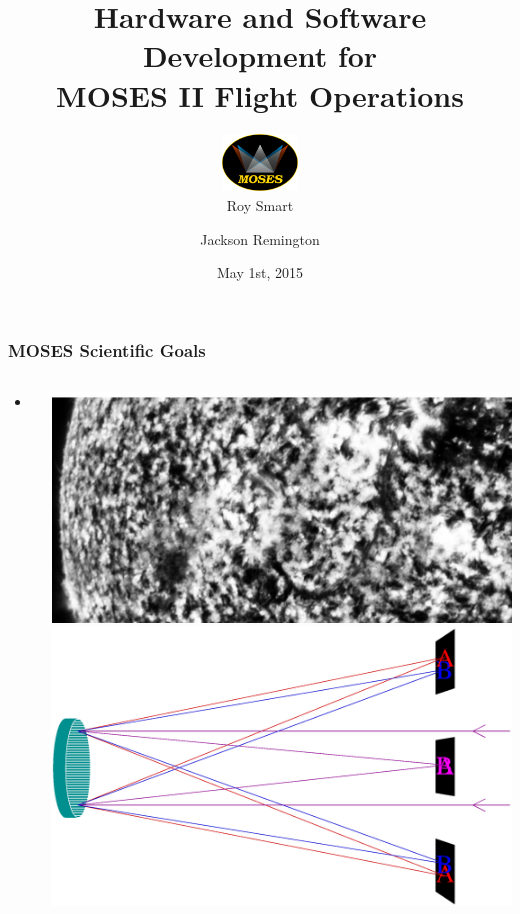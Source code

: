 \documentclass[landscape,xcolor={table}]{beamer}
\title[...]{Hardware and Software Development for \\ MOSES II Flight Operations}
\author[Smart, Remington]{
\includegraphics[width=2cm]{images/moses_logo_with_text} 
\\ Roy Smart \and Jackson Remington}
\institute{Montana State University}
\date{May 1st, 2015 \\ }
\begin{document}
	\begin{frame}[plain]
	        \titlepage
	\end{frame}
	
	\begin{frame}
		
		\frametitle{MOSES Scientific Goals}
		
		\begin{columns}[T] %
		\begin{column}{.48\textwidth}

			\begin{itemize}
				\item hey!
			\end{itemize}
			
		\end{column}%
		\hfill%
		\begin{column}{.48\textwidth}
		
			\includegraphics[width=\textwidth]{images/exp2} \\
			\includegraphics[width=\textwidth]{images/instrument}
		
		\end{column}%
		\end{columns}

	\end{frame}
	
\end{document}
